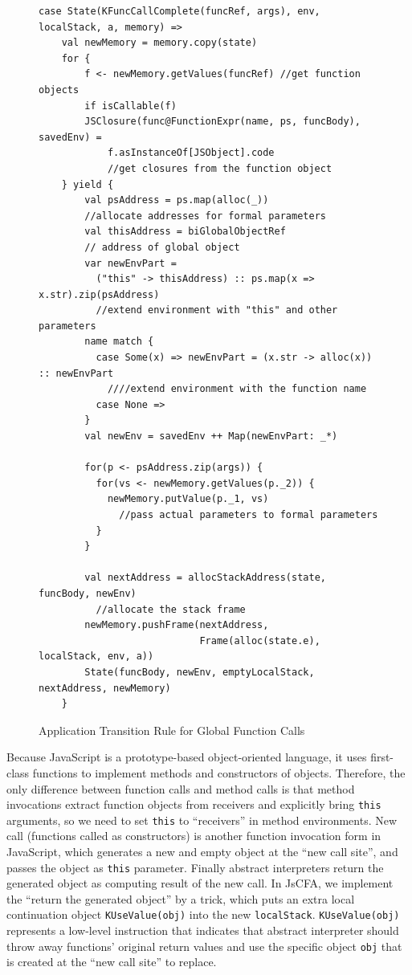 \documentclass{article}
\begin{document}
\begin{figure}
  \lstset{language=Scala}
  \begin{lstlisting}
case State(KFuncCallComplete(funcRef, args), env, localStack, a, memory) =>
    val newMemory = memory.copy(state)
    for {
        f <- newMemory.getValues(funcRef) //get function objects
        if isCallable(f)
        JSClosure(func@FunctionExpr(name, ps, funcBody), savedEnv) =
            f.asInstanceOf[JSObject].code
            //get closures from the function object
    } yield {
        val psAddress = ps.map(alloc(_))
        //allocate addresses for formal parameters
        val thisAddress = biGlobalObjectRef
        // address of global object
        var newEnvPart =
          ("this" -> thisAddress) :: ps.map(x => x.str).zip(psAddress)
          //extend environment with "this" and other parameters
        name match {
          case Some(x) => newEnvPart = (x.str -> alloc(x)) :: newEnvPart
            ////extend environment with the function name
          case None =>
        }
        val newEnv = savedEnv ++ Map(newEnvPart: _*)

        for(p <- psAddress.zip(args)) {
          for(vs <- newMemory.getValues(p._2)) {
            newMemory.putValue(p._1, vs)
              //pass actual parameters to formal parameters
          }
        }

        val nextAddress = allocStackAddress(state, funcBody, newEnv)
          //allocate the stack frame
        newMemory.pushFrame(nextAddress,
                            Frame(alloc(state.e), localStack, env, a))
        State(funcBody, newEnv, emptyLocalStack, nextAddress, newMemory)
    }

  \end{lstlisting}
  \caption{Application Transition Rule for Global Function Calls}
\label{fig:app-call}
\end{figure}

Because JavaScript is a prototype-based object-oriented language, it uses first-class functions to implement methods and constructors of objects.
Therefore, the only difference between function calls and method calls is that method invocations extract function objects from receivers and explicitly bring \verb|this| arguments, so we need to set \verb|this| to ``receivers'' in method environments.
New call (functions called as constructors) is another function invocation form in JavaScript, which generates a new and empty object at the ``new call site'', and passes the object as \verb|this| parameter. Finally abstract interpreters return the generated object as computing result of the new call.
In JsCFA, we implement the ``return the generated object'' by a trick, which puts an extra local continuation object \verb|KUseValue(obj)| into the new \verb|localStack|.
\verb|KUseValue(obj)| represents a low-level instruction that indicates that abstract interpreter should throw away functions' original return values and use the specific object \verb|obj| that is created at the ``new call site'' to replace.
\end{document}
